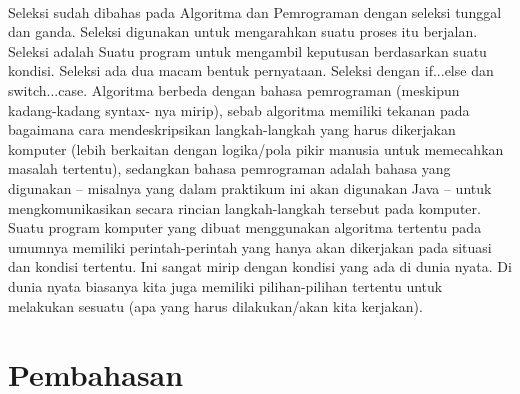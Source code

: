 \documentclass[a4paper,12pt]{article}
\begin{document}
\paragraph{}
Seleksi sudah dibahas pada Algoritma dan Pemrograman dengan seleksi tunggal dan
ganda. Seleksi digunakan untuk mengarahkan suatu proses itu berjalan. Seleksi adalah
Suatu program untuk mengambil keputusan berdasarkan suatu kondisi. Seleksi ada dua
macam bentuk pernyataan. Seleksi dengan if...else dan switch...case.
Algoritma berbeda dengan bahasa pemrograman (meskipun kadang-kadang syntax-
nya mirip), sebab algoritma memiliki tekanan pada bagaimana cara mendeskripsikan
langkah-langkah yang harus dikerjakan komputer (lebih berkaitan dengan logika/pola pikir
manusia untuk memecahkan masalah tertentu), sedangkan bahasa pemrograman adalah
bahasa yang digunakan – misalnya yang dalam praktikum ini akan digunakan Java – untuk
mengkomunikasikan secara rincian langkah-langkah tersebut pada komputer.
Suatu program komputer yang dibuat menggunakan algoritma tertentu pada umumnya
memiliki perintah-perintah yang hanya akan dikerjakan pada situasi dan kondisi tertentu. Ini
sangat mirip dengan kondisi yang ada di dunia nyata. Di dunia nyata biasanya kita juga
memiliki pilihan-pilihan tertentu untuk melakukan sesuatu (apa yang harus dilakukan/akan
kita kerjakan).

\newpage

\section{Pembahasan}
\end{document}
